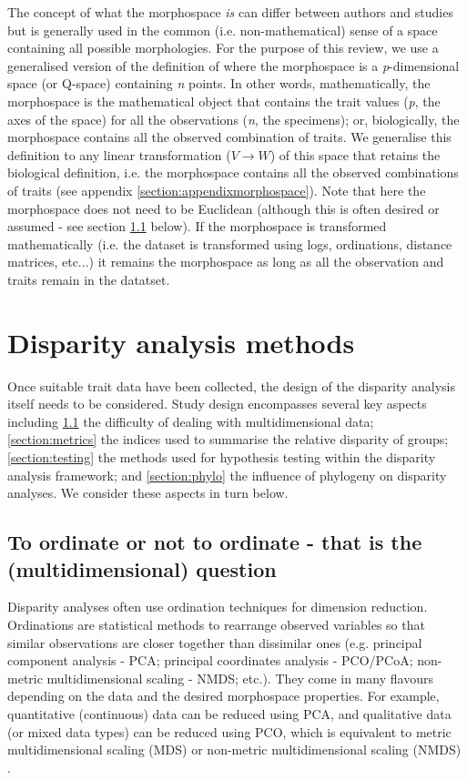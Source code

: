 \documentclass[12pt,letterpaper]{article}
\begin{document}
The concept of what the morphospace \textit{is} can differ between authors and studies but is generally used in the common (i.e. non-mathematical) sense of a space containing all possible morphologies.
For the purpose of this review, we use a generalised version of the definition of \cite{mitteroecker2009concept} where the morphospace is a \textit{p}-dimensional space (or Q-space) containing \textit{n} points.
In other words, mathematically, the morphospace is the mathematical object that contains the trait values (\textit{p}, the axes of the space) for all the observations (\textit{n}, the specimens); or, biologically, the morphospace contains all the observed combination of traits.
We generalise this definition to any linear transformation ($V \to W$) of this space that retains the biological definition, i.e. the morphospace contains all the observed combinations of traits (see appendix \ref{section:appendixmorphospace}).
Note that here the morphospace does not need to be Euclidean (although this is often desired or assumed - see section \ref{section:ordination} below).
If the morphospace is transformed mathematically (i.e. the dataset is transformed using logs, ordinations, distance matrices, etc...) it remains the morphospace as long as all the observation and traits remain in the datatset.


\section{Disparity analysis methods} \label{section:methods}

\noindent Once suitable trait data have been collected, the design of the disparity analysis itself needs to be considered.
Study design encompasses several key aspects including \ref{section:ordination} the difficulty of dealing with multidimensional data; \ref{section:metrics} the indices used to summarise the relative disparity of groups; \ref{section:testing} the methods used for hypothesis testing within the disparity analysis framework; and \ref{section:phylo} the influence of phylogeny on disparity analyses.
We consider these aspects in turn below.

\subsection{To ordinate or not to ordinate - that is the (multidimensional) question} \label{section:ordination}

Disparity analyses often use ordination techniques for dimension reduction.
Ordinations are statistical methods to rearrange observed variables so that similar observations are closer together than dissimilar ones (e.g. principal component analysis - PCA; principal coordinates analysis - PCO/PCoA; non-metric multidimensional scaling - NMDS; etc.).
They come in many flavours depending on the data and the desired morphospace properties.
For example, quantitative (continuous) data can be reduced using PCA, and qualitative data (or mixed data types) can be reduced using PCO, which is equivalent to metric multidimensional scaling (MDS) or non-metric multidimensional scaling (NMDS) \citep[see][chapter 9 for a detailed overview of ordination methods and properties]{Legendre2012-va}.
\end{document}

